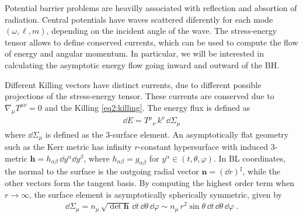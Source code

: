 Potential barrier problems are heavilly associated with reflection and absortion of radiation. 
Central potentials have waves scattered diferently for each mode $(\omega, \ell, m)$, depending on the incident angle of the wave.
The stress-energy tensor allows to define conserved currents, which can be used to compute the flow of energy and angular momentum.
In particular, we will be interested in calculating the asymptotic energy flow going inward and outward of the BH.

Different Killing vectors have distinct currents, due to different possible projections of the stress-energy tensor.
These currents are conserved due to $\nabla_\mu T^{\mu\nu}=0$ and the Killing \eqref{eq2:killing}.
The energy flux is defined as \cite{Townsend1997}
\begin{align}
    \label{eq3:fluxE}
    \dd E = T^{\mu}{}_\nu \, k^\nu \,\dd\Sigma_\mu
\end{align}
where $\dd \Sigma_\mu$ is defined as the 3-surface element.
An asymptotically flat geometry such as the Kerr metric has infinity $r$-constant hypersurface with induced 3-metric $\bm{h} = h_{\alpha\beta} \,\dd y^\alpha \dd y^\beta$, where $h_{\alpha\beta} = g_{\alpha\beta}$ for $y^\alpha \in (t, \theta, \varphi)$.
In BL coordinates, the normal to the surface is the outgoing radial vector $\bm{n}=(\dd r)^\sharp$, while the other vectors form the tangent basis.
By computing the highest order term when $r\to\infty$, the surface element is asymptotically spherically symmetric, given by
\begin{align}
    \label{eq3:radial3SurfaceElement}
    \dd\Sigma_\mu = n_\mu \,\sqrt{\det{\bm{h}}} \,\dd t \,\dd \theta \,\dd \varphi \sim n_\mu \,r^2 \sin\theta \,\dd t \,\dd \theta \,\dd \varphi ~.
\end{align}


